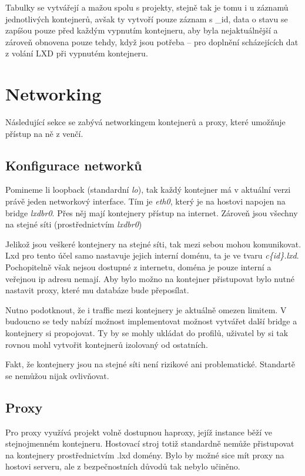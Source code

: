 \documentclass[a4paper,oneside,12pt]{report}
\begin{document}
Tabulky se vytvářejí a mažou spolu s projekty, stejně tak je tomu i u záznamů jednotlivých kontejnerů, avšak ty vytvoří pouze záznam s \_id, data o stavu se zapíšou pouze před každým vypnutím kontejneru, aby byla nejaktuálnější a zároveň obnovena pouze tehdy, když jsou potřeba -- pro doplnění scházejících dat z volání LXD při vypnutém kontejneru.

\section{Networking}

Následující sekce se zabývá networkingem kontejnerů a proxy, které umožňuje přístup na ně z venčí.

\subsection{Konfigurace networků}

Pomineme li loopback (standardní \textit{lo}), tak každý kontejner má v aktuální verzi právě jeden networkový interface.
Tím je \textit{eth0}, který je na hostovi napojen na bridge \textit{lxdbr0}.
Přes něj mají kontejnery přístup na internet.
Zároveň jsou všechny na stejné síti (prostřednictvím \textit{lxdbr0})

Jelikož jsou veškeré kontejnery na stejné síti, tak mezi sebou mohou komunikovat.
Lxd pro tento účel samo nastavuje jejich interní doménu, ta je ve tvaru \textit{c\{id\}.lxd}.
Pochopitelně však nejsou dostupné z internetu, doména je pouze interní a veřejnou ip adresu nemají.
Aby bylo možno na kontejner přistupovat bylo nutné nastavit proxy, které mu databáze bude přeposílat.

Nutno podotknout, že i traffic mezi kontejnery je aktuálně omezen limitem.
V budoucno se tedy nabízí možnost implementovat možnost vytvářet další bridge a kontejnery si propojovat.
Ty by se mohly ukládat do profilů, uživatel by si tak rovnou mohl vytvořit kontejnerů izolovaný od ostatních.

Fakt, že kontejnery jsou na stejné síti není rizikové ani problematické.
Standartě se nemůžou nijak ovlivňovat.

\subsection{Proxy}

Pro proxy využívá projekt volně dostupnou haproxy, jejíž instance běží ve stejnojmenném kontejneru.
Hostovací stroj totiž standardně nemůže přistupovat na kontejnery prostřednictvím .lxd domény.
Bylo by možné sice mít proxy na hostovi serveru, ale z bezpečnostních důvodů tak nebylo učiněno.
\end{document}
